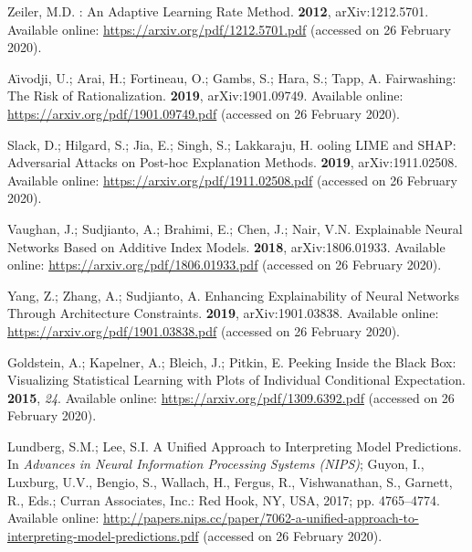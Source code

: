 \documentclass[information,article,accept,moreauthors,pdftex]{Definitions/mdpi}
\begin{document}
{\begin{thebibliography}{999}
Zeiler, M.D.
: {A}n {A}daptive {L}earning {R}ate {M}ethod.
 {\bf 2012}, arXiv:1212.5701.
\newblock Available online: \url{https://arxiv.org/pdf/1212.5701.pdf} (accessed on 26 February 2020).

A{\"\i}vodji, U.; Arai, H.; Fortineau, O.; Gambs, S.; Hara, S.; Tapp, A.
\newblock Fairwashing: {T}he {R}isk of {R}ationalization.
 {\bf 2019}, arXiv:1901.09749.
\newblock Available online: \url{https://arxiv.org/pdf/1901.09749.pdf} (accessed on 26 February 2020).

Slack, D.; Hilgard, S.; Jia, E.; Singh, S.; Lakkaraju, H.
ooling {L}{I}{M}{E} and {S}{H}{A}{P}: {A}dversarial {A}ttacks on
  {P}ost-hoc {E}xplanation {M}ethods.
 {\bf 2019}, arXiv:1911.02508.
\newblock Available online: \url{https://arxiv.org/pdf/1911.02508.pdf} (accessed on 26 February 2020).

Vaughan, J.; Sudjianto, A.; Brahimi, E.; Chen, J.; Nair, V.N.
\newblock Explainable {N}eural {N}etworks {B}ased on {A}dditive {I}ndex
  {M}odels.
 {\bf 2018}, arXiv:1806.01933.
\newblock Available online: \url{https://arxiv.org/pdf/1806.01933.pdf} (accessed on 26 February 2020).

Yang, Z.; Zhang, A.; Sudjianto, A.
\newblock Enhancing {E}xplainability of {N}eural {N}etworks {T}hrough
  {A}rchitecture {C}onstraints.
 {\bf 2019}, arXiv:1901.03838.
\newblock Available online: \url{https://arxiv.org/pdf/1901.03838.pdf} (accessed on 26 February 2020).

Goldstein, A.; Kapelner, A.; Bleich, J.; Pitkin, E.
\newblock Peeking {I}nside the {B}lack {B}ox: {V}isualizing {S}tatistical
  {L}earning with {P}lots of {I}ndividual {C}onditional {E}xpectation.
 {\bf 2015},
  {\em 24}.
\newblock Available online: \url{https://arxiv.org/pdf/1309.6392.pdf} (accessed on 26 February 2020).

Lundberg, S.M.; Lee, S.I.
\newblock A {U}nified {A}pproach to {I}nterpreting {M}odel {P}redictions. In
  {\em Advances in Neural Information Processing Systems (NIPS)}; Guyon, I.,
  Luxburg, U.V., Bengio, S., Wallach, H., Fergus, R., Vishwanathan, S.,
  Garnett, R., Eds.; Curran Associates, Inc.: Red Hook, NY, USA, 2017; pp. 4765--4774.  
\newblock Available online: 
  \url{http://papers.nips.cc/paper/7062-a-unified-approach-to-interpreting-model-predictions.pdf} (accessed on 26 February 2020).


\end{thebibliography}}
\end{document}
